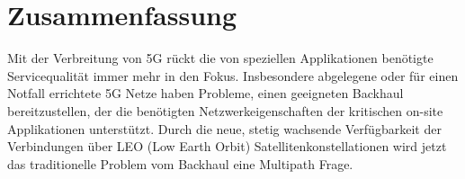 \section*{Zusammenfassung}







Mit der Verbreitung von 5G rückt die von speziellen Applikationen benötigte Servicequalität immer mehr in den Fokus. Insbesondere abgelegene oder für einen Notfall errichtete 5G Netze haben Probleme, einen geeigneten Backhaul bereitzustellen, der die benötigten Netzwerkeigenschaften der kritischen on-site Applikationen unterstützt. Durch die neue, stetig wachsende Verfügbarkeit der Verbindungen über LEO (Low Earth Orbit) Satellitenkonstellationen wird jetzt das traditionelle Problem vom Backhaul eine Multipath Frage.

